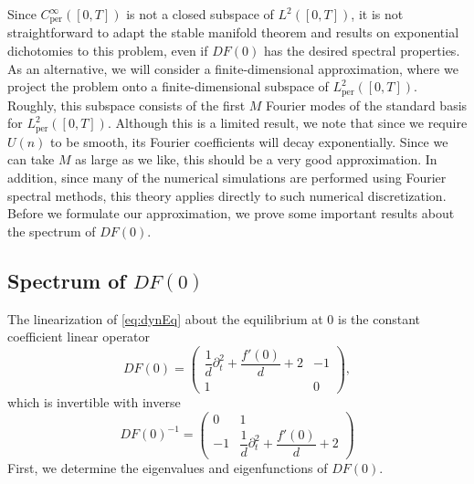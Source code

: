 \documentclass[12pt,reqno]{amsart}
\def\per{\textrm{per}}
\theoremstyle{definition}
\begin{document}
Since $C_\per^\infty([0,T])$ is not a closed subspace of $L^2([0,T])$, it is not straightforward to adapt the stable manifold theorem and results on exponential dichotomies to this problem, even if $DF(0)$ has the desired spectral properties. As an alternative, we will consider a finite-dimensional approximation, where we project the problem onto a finite-dimensional subspace of $L_\per^2([0,T])$. Roughly, this subspace consists of the first $M$ Fourier modes of the standard basis for $L_\per^2([0,T])$. Although this is a limited result, we note that since we require $U(n)$ to be smooth, its Fourier coefficients will decay exponentially. Since we can take $M$ as large as we like, this should be a very good approximation. In addition, since many of the numerical simulations are performed using Fourier spectral methods, this theory applies directly to such numerical discretization. Before we formulate our approximation, we prove some important results about the spectrum of $DF(0)$.

\subsection{Spectrum of \texorpdfstring{$DF(0)$}{DF(0)}}

The linearization of \cref{eq:dynEq} about the equilibrium at 0 is the constant coefficient linear operator 
\begin{equation}\label{eq:DF0}
DF(0) = \begin{pmatrix}
\dfrac{1}{d}\partial_t^2 + \dfrac{f'(0)}{d} + 2 & -1 \\ 1 & 0
\end{pmatrix},
\end{equation}
which is invertible with inverse
\begin{equation}\label{eq:DF0inv}
DF(0)^{-1} = \begin{pmatrix}
0 & 1 \\ -1 & \dfrac{1}{d}\partial_t^2 + \dfrac{f'(0)}{d} + 2
\end{pmatrix}
\end{equation}
First, we determine the eigenvalues and eigenfunctions of $DF(0)$.
\end{document}
